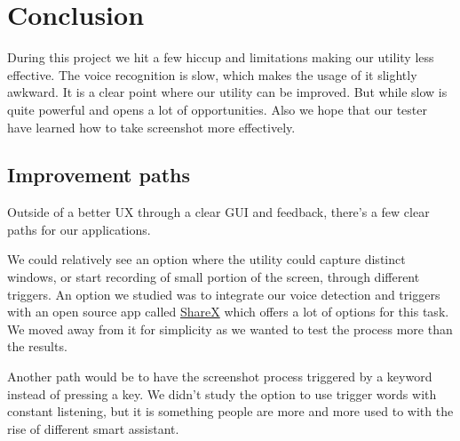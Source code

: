 \section{Conclusion}

During this project we hit a few hiccup and limitations making our utility less effective. 
The voice recognition is slow, which makes the usage of it slightly awkward.
It is a clear point where our utility can be improved.
But while slow is quite powerful and opens a lot of opportunities. 
Also we hope that our tester have learned how to take screenshot more effectively.

\subsection{Improvement paths}
Outside of a better UX through a clear GUI and feedback, there's a few clear paths for our applications.


We could relatively see an option where the utility could capture distinct windows, or start recording of small portion of the screen, through different triggers.
An option we studied was to integrate our voice detection and triggers with an open source app called \href{https://getsharex.com/}{ShareX} which offers a lot of options for this task.
We moved away from it for simplicity as we wanted to test the process more than the results.

Another path would be to have the screenshot process triggered by a keyword instead of pressing a key.
We didn't study the option to use trigger words with constant listening, but it is something people are more and more used to with the rise of different smart assistant. 

